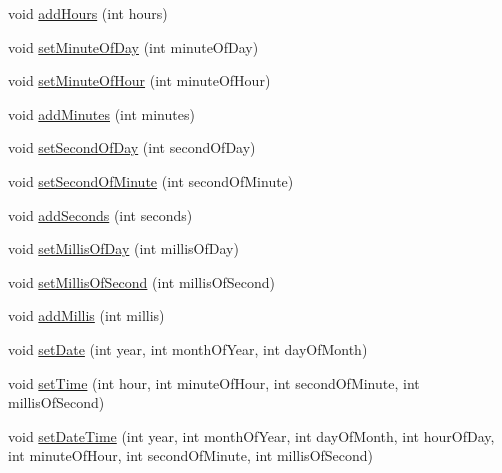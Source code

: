 \begin{DoxyCompactItemize}
\item 
void \hyperlink{interfaceorg_1_1joda_1_1time_1_1_read_writable_date_time_a65303f7280a54d1bfcb3f4640097bf87}{add\-Hours} (int hours)
\item 
void \hyperlink{interfaceorg_1_1joda_1_1time_1_1_read_writable_date_time_ac7f52953dd38dc745346b45f9fedb13d}{set\-Minute\-Of\-Day} (int minute\-Of\-Day)
\item 
void \hyperlink{interfaceorg_1_1joda_1_1time_1_1_read_writable_date_time_a1f13e6b8c9ff4d4fb91acb43a7bd8d81}{set\-Minute\-Of\-Hour} (int minute\-Of\-Hour)
\item 
void \hyperlink{interfaceorg_1_1joda_1_1time_1_1_read_writable_date_time_a5923aacae3740c4d9a53e230091d0531}{add\-Minutes} (int minutes)
\item 
void \hyperlink{interfaceorg_1_1joda_1_1time_1_1_read_writable_date_time_a97e602ec2229c370f3c8f90a94d12728}{set\-Second\-Of\-Day} (int second\-Of\-Day)
\item 
void \hyperlink{interfaceorg_1_1joda_1_1time_1_1_read_writable_date_time_a12c9139f335588114266c4355639ecf5}{set\-Second\-Of\-Minute} (int second\-Of\-Minute)
\item 
void \hyperlink{interfaceorg_1_1joda_1_1time_1_1_read_writable_date_time_a03254501f6044aea9c9ebe9cbc27c8cc}{add\-Seconds} (int seconds)
\item 
void \hyperlink{interfaceorg_1_1joda_1_1time_1_1_read_writable_date_time_a107789166b4626aad42aaa264baf4adc}{set\-Millis\-Of\-Day} (int millis\-Of\-Day)
\item 
void \hyperlink{interfaceorg_1_1joda_1_1time_1_1_read_writable_date_time_af92c3f869693077e5a578d63568137d0}{set\-Millis\-Of\-Second} (int millis\-Of\-Second)
\item 
void \hyperlink{interfaceorg_1_1joda_1_1time_1_1_read_writable_date_time_a5f9ff49f1137abc3b61e54c2d40f0365}{add\-Millis} (int millis)
\item 
void \hyperlink{interfaceorg_1_1joda_1_1time_1_1_read_writable_date_time_a101e098c0acea849e3b2b109b23f7ce4}{set\-Date} (int year, int month\-Of\-Year, int day\-Of\-Month)
\item 
void \hyperlink{interfaceorg_1_1joda_1_1time_1_1_read_writable_date_time_a6f55b6242df79c9c9e9736c52631a8c8}{set\-Time} (int hour, int minute\-Of\-Hour, int second\-Of\-Minute, int millis\-Of\-Second)
\item 
void \hyperlink{interfaceorg_1_1joda_1_1time_1_1_read_writable_date_time_a56a7e48742c7c6e37a20f07db9d33508}{set\-Date\-Time} (int year, int month\-Of\-Year, int day\-Of\-Month, int hour\-Of\-Day, int minute\-Of\-Hour, int second\-Of\-Minute, int millis\-Of\-Second)
\end{DoxyCompactItemize}


